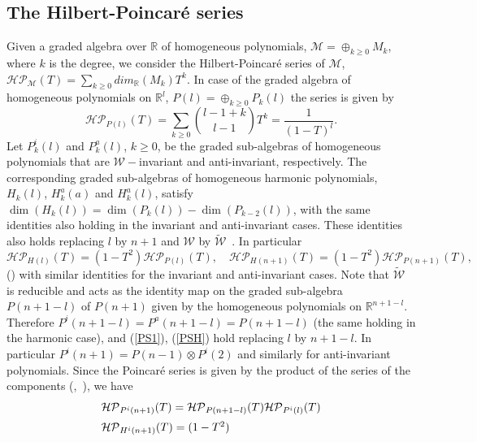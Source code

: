 \documentclass[11pt,a4paper,times]{amsart}
\theoremstyle{plain}
\theoremstyle{definition}
\numberwithin{equation}{section}
\newcommand{\eqskip}{ \vspace*{2mm}\\ }
\newcommand{\txtg}{\textcolor{green}}
\begin{document}
{\subsection{The Hilbert-Poincar\'{e} series}\label{Sec. 6.2}
Given a graded algebra over $\mathbb{R}$ of homogeneous polynomials,
$\mathcal{M}=\oplus_{k\geq 0}M_k$,
where $k$ is the degree, we consider the Hilbert-Poincar\'{e} series of $\mathcal{M}$, 
$\mathcal{HP}_{\mathcal{M}}(T)=\sum_{k\geq 0} dim_{\mathbb{R}}(M_k)T^k$. 
In case of the graded algebra of homogeneous polynomials on $\mathbb{R}^l$, $P(l)=\oplus_{k\geq 0}P_k(l)$ the series is given by~\cite{amd} %
\begin{equation}\label{PS1}
\mathcal{HP}_{P(l)}(T)=\sum_{k\geq 0}\binom{l-1+k}{l-1}T^k=\frac{1}{(1-T)^l}.
\end{equation}
Let $P^{i}_k(l)$ and $P^{a}_k(l)$, $k\geq 0$, be the graded sub-algebras of homogeneous polynomials that are $\mathcal{W}-$invariant
and anti-invariant, respectively. The corresponding graded sub-algebras of homogeneous harmonic polynomials,
$H_k(l)$, $H^{a}_k(a)$ and $H^{a}_k(l)$, satisfy $\dim(H_k(l))=\dim(P_k(l))-\dim(P_{k-2}(l))$, with the same identities also holding in the invariant and anti-invariant cases. These identities also holds  replacing $l$ by $n+1$
and $\mathcal{W}$ by $\tilde{\mathcal{W}}$~\cite[B.12]{bb}. 
In particular
\begin{equation}\label{PSH}
 \mathcal{HP}_{H(l)}(T)=(1-T^2)\mathcal{HP}_{ P(l)}(T),\quad
  \mathcal{HP}_{H(n+1)}(T)=(1-T^2)\mathcal{HP}_{P(n+1)}(T),
\end{equation}
(\cite[Section C.2]{bb}) 
with similar identities for the invariant and anti-invariant cases.
{Note that $\tilde{\mathcal{W}}$ is reducible and acts as the identity map on the graded sub-algebra $P(n+1-l)$ of $P(n+1)$ given by
the homogeneous polynomials on $\mathbb{R}^{n+1-l}$.
Therefore $P^{i}(n+1-l)=P^{a}(n+1-l)=P(n+1-l)$ (the same holding in the harmonic case), and
 (\ref{PS1}), (\ref{PSH}) hold replacing $l$ by $n+1-l$. In particular $P^{i}(n+1)=P(n-1)\otimes P^{i}(2)$ and similarly for anti-invariant
 polynomials. Since the Poincar\'{e} series is given by the product of the series of the components (\cite[C.5. and  Prop. 6, first equality
 p.243]{bb},~\cite[V.5.1, p.103, (2)]{BOU}), we have}
\begin{equation}\label{NOTIRREDU}
\begin{array}{l}
\mathcal{HP}_{P^{i}(n+1)}(T)=
\mathcal{HP}_{P(n+1-l)}(T)\mathcal{HP}_{P^{i}(l)}(T)\eqskip
\mathcal{HP}_{H^{i}(n+1)}(T)=(1-T^2)

\end{array}
\end{equation}}
\end{document}
